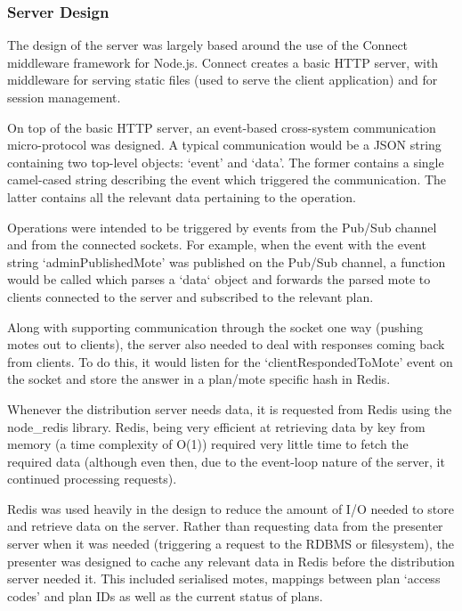\documentclass[a4papert,11pt,notitlepage]{article}
\begin{document}
\subsubsection{Server Design}
The design of the server was largely based around the use of the Connect\cite{connect:web} middleware framework for Node.js. Connect creates a basic HTTP server, with middleware for serving static files (used to serve the client application) and for session management.

On top of the basic HTTP server, an event-based cross-system communication micro-protocol was designed. A typical communication would be a JSON string containing two top-level objects: `event' and `data'. The former contains a single camel-cased string describing the event which triggered the communication. The latter contains all the relevant data pertaining to the operation.

Operations were intended to be triggered by events from the Pub/Sub channel and from the connected sockets. For example, when the event  with the event string `adminPublishedMote' was published on the Pub/Sub channel, a function would be called which parses a `data` object and forwards the parsed mote to clients connected to the server and subscribed to the relevant plan.

Along with supporting communication through the socket one way (pushing motes out to clients), the server also needed to deal with responses coming back from clients. To do this, it would listen for the `clientRespondedToMote' event on the socket and store the answer in a plan/mote specific hash in Redis.

Whenever the distribution server needs data, it is requested from Redis using the node\_redis\cite{noderedis:web} library. Redis, being very efficient at retrieving data by key from memory (a time complexity of O(1)) required very little time to fetch the required data (although even then, due to the event-loop nature of the server, it continued processing requests).

Redis was used heavily in the design to reduce the amount of I/O needed to store and retrieve data on the server. Rather than requesting data from the presenter server when it was needed (triggering a request to the RDBMS or filesystem), the presenter was designed to cache any relevant data in Redis before the distribution server needed it. This included serialised motes, mappings between plan `access codes' and plan IDs as well as the current status of plans.
\end{document}
